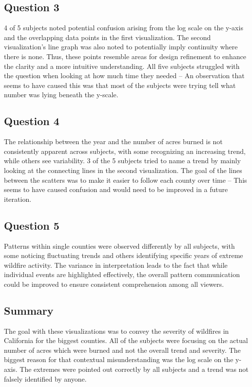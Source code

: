 \subsection*{Question 3}
4 of 5 subjects noted potential confusion arising from the log scale on the y-axis and the overlapping 
data points in the first visualization. The second visualization's line graph was also noted to potentially 
imply continuity where there is none. Thus, these points resemble areas for design refinement to enhance the 
clarity and a more intuitive understanding. All five subjects struggled with the question when looking at how
much time they needed -- An observation that seems to have caused this was that most of the subjects were 
trying tell what number was lying beneath the y-scale.

\subsection*{Question 4}
The relationship between the year and the number of acres burned is not consistently apparent across subjects, 
with some recognizing an increasing trend, while others see variability. 3 of the 5 subjects tried to name a trend
by mainly looking at the connecting lines in the second visualization. The goal of the lines between the scatters
was to make it easier to follow each county over time -- This seems to have caused confusion and would need to be
improved in a future iteration. 

\subsection*{Question 5}
Patterns within single counties were observed differently by all subjects, with some noticing fluctuating trends 
and others identifying specific years of extreme wildfire activity. The variance in interpretation leads to the fact 
that while individual events are highlighted effectively, the overall pattern communication could be improved 
to ensure consistent comprehension among all viewers.

\subsection*{Summary}
The goal with these visualizations was to convey the severity of wildfires in California for the biggest counties.
All of the subjects were focusing on the actual number of acres which were burned and not the overall trend and 
severity. The biggest reason for that contextual misunderstanding was the log scale on the y-axis.
The extremes were pointed out correctly by all subjects and a trend was not falsely identified by anyone.